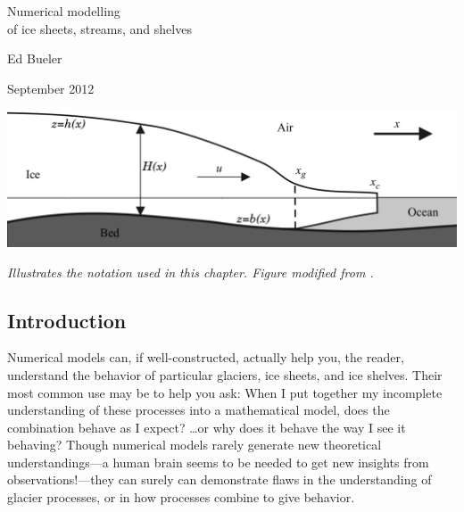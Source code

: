 \documentclass[titlepage,letterpaper,final,12pt]{scrartcl}
\begin{document}
\graphicspath{{../photos/}{../pdffigs/}}


\begin{titlepage}

  \begin{center}
    {\Large{} Numerical modelling \\ of ice sheets, streams, and shelves}
    \vspace{0.5cm}

    {\large Ed Bueler}
    \vspace{1cm}

    September 2012

    \vfill
    
    \includegraphics[width=6.0in]{flowline}
  
    \scriptsize \emph{Illustrates the notation used in this chapter.  Figure modified from \cite{SchoofMarine1}.} \normalsize
    
    \vspace{2.0in}
  \end{center}
\end{titlepage}


\clearpage\newpage
\setcounter{section}{1}
\subsection{Introduction}

Numerical models can, if well-constructed, actually help you, the reader, understand the behavior of particular glaciers, ice sheets, and ice shelves.  Their most common use may be to help you ask: When I put together my incomplete understanding of these processes into a mathematical model, does the combination behave as I expect? \dots or why does it behave the way I see it behaving?  Though numerical models rarely generate new theoretical understandings---a human brain seems to be needed to get new insights from observations!---they can surely can demonstrate flaws in the understanding of glacier processes, or in how processes combine to give behavior.
\end{document}

